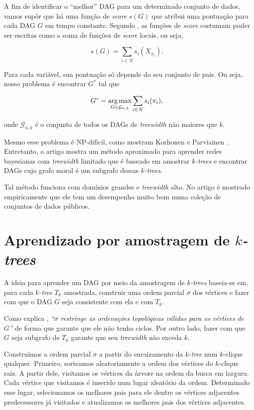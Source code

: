 \vspace{2em}

A fim de identificar o ``melhor'' DAG para um determinado conjunto de dados, vamos supôr que há uma função de \emph{score} $s(G)$ que atribui uma pontuação para cada DAG $G$ em tempo constante. Segundo \cite{nie}, as funções de \emph{score} costumam poder ser escritas como a soma de funções de \emph{score} locais, ou seja,

$$s(G) = \sum_{i \in N} s_i(X_{\pi_i}).$$

Para cada variável, sua pontuação só depende do seu conjunto de pais. Ou seja, nosso problema é encontrar $G^*$ tal que

$$G^* = \operatorname*{arg\,max}_{G \in \mathcal{G}_{n,k}} \sum_{i \in N} s_i(\pi_i),$$

onde $\mathcal{G}_{n,k}$ é o conjunto de todos os DAGs de \emph{treewidth} não maiores que $k$.

Mesmo esse problema é NP-difícil, como mostram Korhonen e Parviainen \cite{korhonen}. Entretanto, o artigo \cite{maua} mostra um método aproximado para aprender redes bayesianas com \emph{treewidth} limitado que é baseado em amostrar \emph{$k$-trees} e encontrar DAGs cujo grafo moral é um subgrafo dessas \emph{$k$-trees}.

Tal método funciona com domínios grandes e \emph{treewidth} alto. No artigo é mostrado empiricamente que ele tem um desempenho muito bom numa coleção de conjuntos de dados públicos.

\section{Aprendizado por amostragem de \emph{$k$-trees}}
\label{sec:aprendizado}

A ideia para aprender um DAG por meio da amostragem de \emph{$k$-trees} baseia-se em, para cada \emph{$k$-tree} $T_k$ amostrada, construir uma ordem parcial $\sigma$ dos vértices e fazer com que o DAG $G$ seja consistente com ela e com $T_k$.

Como explica \cite{maua}, \emph{``$\sigma$ restringe as ordenações topológicas válidas para os vértices de $G$''} de forma que garante que ele não tenha ciclos. Por outro lado, fazer com que $G$ seja subgrafo de $T_k$ garante que seu \emph{treewidth} não exceda $k$.

Construímos a ordem parcial $\sigma$ a partir do enraizamento da \emph{$k$-tree} num $k$-clique qualquer. Primeiro, sorteamos aleatoriamente a ordem dos vértices do $k$-clique raiz. A partir dele, visitamos os vértices da árvore na ordem da busca em largura. Cada vértice que visitamos é inserido num lugar aleatório da ordem. Determinado esse lugar, selecionamos os melhores pais para ele dentre os vértices adjacentes predecessores já visitados e atualizamos os melhores pais dos vértices adjacentes.

